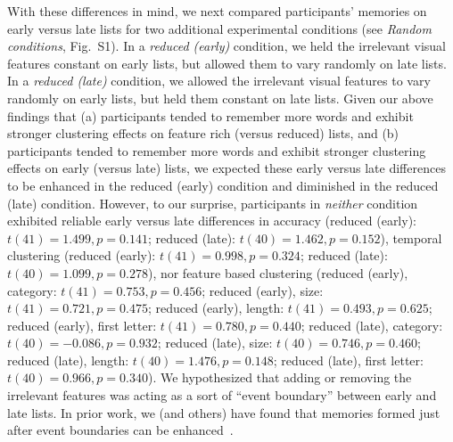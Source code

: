 \documentclass[11pt]{article}
\newcommand{\dynamicsRandom}{S1}
\begin{document}
With these differences in mind, we next compared participants' memories on
early versus late lists for two additional experimental conditions (see
\textit{Random conditions}, Fig.~\dynamicsRandom). In a \textit{reduced
(early)} condition, we held the irrelevant visual features constant on early
lists, but allowed them to vary randomly on late lists. In a \textit{reduced
(late)} condition, we allowed the irrelevant visual features to vary randomly
on early lists, but held them constant on late lists. Given our above findings
that (a) participants tended to remember more words and exhibit stronger
clustering effects on feature rich (versus reduced) lists, and (b) participants
tended to remember more words and exhibit stronger clustering effects on early
(versus late) lists, we expected these early versus late differences to be
enhanced in the reduced (early) condition and diminished in the reduced (late)
condition. However, to our surprise, participants in \textit{neither} condition
exhibited reliable early versus late differences in accuracy (reduced (early):
$t(41) = 1.499, p = 0.141$; reduced (late): $t(40) = 1.462, p = 0.152$),
temporal clustering (reduced (early): $t(41) = 0.998, p = 0.324$; reduced
(late): $t(40) = 1.099, p = 0.278$), nor feature based clustering (reduced
(early), category: $t(41) = 0.753, p = 0.456$; reduced (early), size: $t(41) =
0.721, p = 0.475$; reduced (early), length: $t(41) = 0.493, p = 0.625$; reduced
(early), first letter: $t(41) = 0.780, p = 0.440$; reduced (late), category:
$t(40) = -0.086, p = 0.932$; reduced (late), size: $t(40) = 0.746, p = 0.460$;
reduced (late), length: $t(40) = 1.476, p = 0.148$; reduced (late), first
letter: $t(40) = 0.966, p = 0.340$). We hypothesized that adding or removing
the irrelevant features was acting as a sort of ``event boundary'' between
early and late lists. In prior work, we (and others) have found that memories
formed just after event boundaries can be enhanced~\citep[e.g., due to less
contextual interference between pre- and post-boundary items;][]{MannEtal16}.
\end{document}
